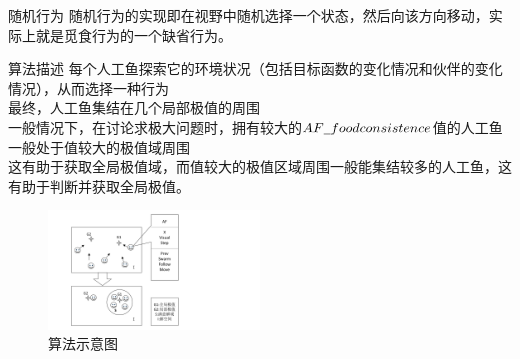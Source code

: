 \documentclass[a4paper, 11pt]{article}
\begin{document}
\begin{section}
\begin{subsection}
		\small{随机行为}
		随机行为的实现即在视野中随机选择一个状态，然后向该方向移动，实际上就是觅食行为的一个缺省行为。
	\end{subsection}
	\begin{subsection}{算法描述}
	每个人工鱼探索它的环境状况（包括目标函数的变化情况和伙伴的变化情况），从而选择一种行为\\最终，人工鱼集结在几个局部极值的周围\\一般情况下，在讨论求极大问题时，拥有较大的$AF\underline{\hspace{0.5em}}foodconsistence$值的人工鱼一般处于值较大的极值域周围\\这有助于获取全局极值域，而值较大的极值区域周围一般能集结较多的人工鱼，这有助于判断并获取全局极值。
		\begin{figure}[htbp]
			\centering
			\includegraphics[width=0.5\textwidth]{../../pic/fish3.pdf}
			\caption{算法示意图}
		\end{figure}
	\end{subsection}
\end{section}
\end{document}
